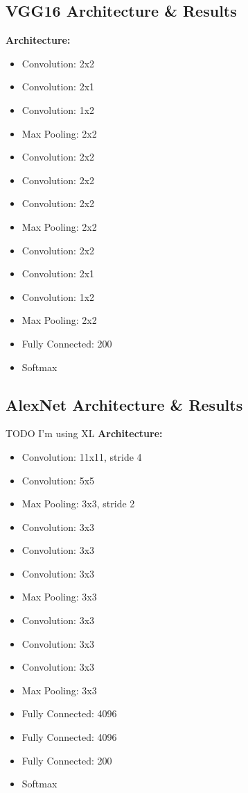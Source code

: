 \documentclass[10pt]{article} %
\begin{document}
	\subsection{VGG16 Architecture \& Results}
	\begin{tcolorbox}
		\textbf{Architecture:}
		\begin{itemize}
			\setlength\itemsep{-0.3em}
			\item Convolution: 2x2
			\item Convolution: 2x1
			\item Convolution: 1x2
			\item Max Pooling: 2x2
			\item Convolution: 2x2
			\item Convolution: 2x2
			\item Convolution: 2x2
			\item Max Pooling: 2x2
			\item Convolution: 2x2
			\item Convolution: 2x1
			\item Convolution: 1x2
			\item Max Pooling: 2x2
			\item Fully Connected: 200
			\item Softmax
		\end{itemize}
	\end{tcolorbox}
	
	\subsection{AlexNet Architecture \& Results}
	\begin{tcolorbox}
		TODO I'm using XL
		\textbf{Architecture:}
		\begin{itemize}
			\setlength\itemsep{-0.3em}
			\item Convolution: 11x11, stride 4
			\item Convolution: 5x5
			\item Max Pooling: 3x3, stride 2
			\item Convolution: 3x3
			\item Convolution: 3x3
			\item Convolution: 3x3
			\item Max Pooling: 3x3
			\item Convolution: 3x3
			\item Convolution: 3x3
			\item Convolution: 3x3
			\item Max Pooling: 3x3
			\item Fully Connected: 4096
			\item Fully Connected: 4096
			\item Fully Connected: 200
			\item Softmax
		\end{itemize}
	\end{tcolorbox}
	
\end{document}
